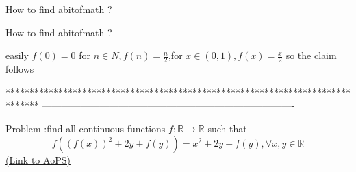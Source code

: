 \begin{solution}
	How to find abitofmath ?
\end{solution}



\begin{solution}
	\begin{tcolorbox}How to find abitofmath ?\end{tcolorbox}
easily $f(0)=0$ for $n\in N,f(n)=\frac n 2$,for $x \in (0,1),f(x)=\frac x 2$ so the claim follows
\end{solution}
*******************************************************************************
-------------------------------------------------------------------------------

\begin{problem}
	Problem :find all  continuous  functions $f:\mathbb{R}\to\mathbb{R}$ such that \[ f((f(x))^2+2y +f(y))=x^2+2y+f(y),\forall x,y\in \mathbb{R}\]
	\flushright \href{https://artofproblemsolving.com/community/c6h527375}{(Link to AoPS)}
\end{problem}



